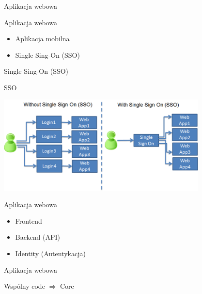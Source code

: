 \documentclass{beamer}
\begin{document}
\begin{frame}{}
	\begin{center}
		\Huge{Aplikacja webowa}
	\end{center}
\end{frame}

\begin{frame}{Aplikacja webowa}
	\begin{huge}
		\begin{itemize}[<+->]
			\item Aplikacja mobilna
			\item Single Sing-On (SSO)
		\end{itemize}
	\end{huge}
\end{frame}

\begin{frame}{}
	\begin{center}
		\Huge{Single Sing-On (SSO)}
	\end{center}
\end{frame}

\begin{frame}{SSO}
	\begin{center}
  		\includegraphics[height=5cm]{sso2.png}
	\end{center}
\end{frame}

\begin{frame}{Aplikacja webowa}
	\begin{huge}
		\begin{itemize}
			\item Frontend
			\item Backend (API)
			\item Identity (Autentykacja)
		\end{itemize}
	\end{huge}
\end{frame}

\begin{frame}{Aplikacja webowa}
	\begin{center}
		\Huge{Wspólny code $\Rightarrow$ Core}
	\end{center}
\end{frame}
\end{document}
